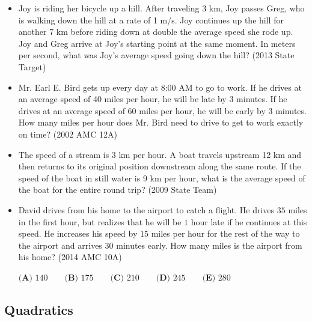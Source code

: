 \documentclass{article}
\begin{document}
\begin{itemize}
\item Joy is riding her bicycle up a hill. After traveling 3 km, Joy passes Greg, who is walking down the hill at a rate of 1 m/s. Joy continues up the hill for another 7 km before riding down at double the average speed she rode up. Joy and Greg arrive at Joy's starting point at the same moment. In meters per second, what was Joy's average speed going down the hill? (2013 State Target)

\item Mr. Earl E. Bird gets up every day at 8:00 AM to go to work. If he drives at an average speed of 40 miles per hour, he will be late by 3 minutes. If he drives at an average speed of 60 miles per hour, he will be early by 3 minutes. How many miles per hour does Mr. Bird need to drive to get to work exactly on time? (2002 AMC 12A)

\item The speed of a stream is 3 km per hour. A boat travels upstream 12 km and then returns to its original position downstream along the same route. If the speed of the boat in still water is 9 km per hour, what is the average speed of the boat for the entire round trip? (2009 State Team)

\item David drives from his home to the airport to catch a flight.  He drives $35$ miles in the first hour, but realizes that he will be $1$ hour late if he continues at this speed.  He increases his speed by $15$ miles per hour for the rest of the way to the airport and arrives $30$ minutes early.  How many miles is the airport from his home? (2014 AMC 10A)

$\textbf{(A) }140\qquad
\textbf{(B) }175\qquad
\textbf{(C) }210\qquad
\textbf{(D) }245\qquad
\textbf{(E) }280\qquad$

\end{itemize}



\subsection{Quadratics}
\end{document}
